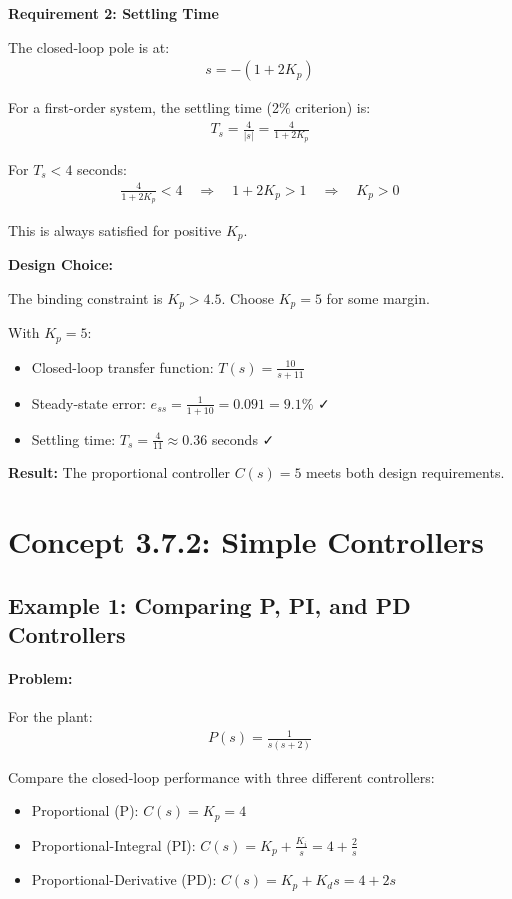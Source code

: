 \documentclass[11pt,a4paper]{article}
\begin{document}
\textbf{Requirement 2: Settling Time}

The closed-loop pole is at:
\begin{align}
s = -(1 + 2K_p)
\end{align}

For a first-order system, the settling time (2\% criterion) is:
\begin{align}
T_s = \frac{4}{|s|} = \frac{4}{1 + 2K_p}
\end{align}

For $T_s < 4$ seconds:
\begin{align}
\frac{4}{1 + 2K_p} < 4 \quad \Rightarrow \quad 1 + 2K_p > 1 \quad \Rightarrow \quad K_p > 0
\end{align}

This is always satisfied for positive $K_p$.

\textbf{Design Choice:}

The binding constraint is $K_p > 4.5$. Choose $K_p = 5$ for some margin.

With $K_p = 5$:
\begin{itemize}
\item Closed-loop transfer function: $T(s) = \frac{10}{s+11}$
\item Steady-state error: $e_{ss} = \frac{1}{1+10} = 0.091 = 9.1\%$ ✓
\item Settling time: $T_s = \frac{4}{11} \approx 0.36$ seconds ✓
\end{itemize}

\textbf{Result:} The proportional controller $C(s) = 5$ meets both design requirements.

\section{Concept 3.7.2: Simple Controllers}

\subsection{Example 1: Comparing P, PI, and PD Controllers}

\paragraph{Problem:} For the plant:
\begin{align}
P(s) = \frac{1}{s(s+2)}
\end{align}

Compare the closed-loop performance with three different controllers:
\begin{itemize}
\item[(a)] Proportional (P): $C(s) = K_p = 4$
\item[(b)] Proportional-Integral (PI): $C(s) = K_p + \frac{K_i}{s} = 4 + \frac{2}{s}$
\item[(c)] Proportional-Derivative (PD): $C(s) = K_p + K_d s = 4 + 2s$
\end{itemize}
\end{document}

